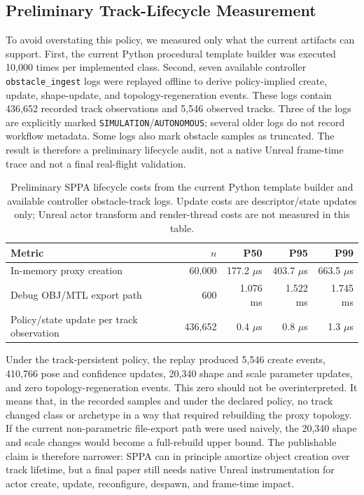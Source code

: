 ﻿\documentclass[11pt,a4paper]{article}
\begin{document}
\subsection{Preliminary Track-Lifecycle Measurement}

To avoid overstating this policy, we measured only what the current artifacts
can support. First, the current Python procedural template builder was executed
10,000 times per implemented class. Second, seven available controller
\texttt{obstacle\_ingest} logs were replayed offline to derive policy-implied
create, update, shape-update, and topology-regeneration events. These logs
contain 436,652 recorded track observations and 5,546 observed tracks. Three of
the logs are explicitly marked \texttt{SIMULATION}/\texttt{AUTONOMOUS}; several
older logs do not record workflow metadata. Some logs also mark obstacle
samples as truncated. The result is therefore a preliminary lifecycle audit,
not a native Unreal frame-time trace and not a final real-flight validation.

\begin{table}[h]
\centering
\small
\setlength{\tabcolsep}{4pt}
\caption{Preliminary SPPA lifecycle costs from the current Python template
builder and available controller obstacle-track logs. Update costs are
descriptor/state updates only; Unreal actor transform and render-thread costs
are not measured in this table.}
\label{tab:sppa-lifecycle}
\begin{tabular}{@{}p{4.7cm}r r r r@{}}
\toprule
Metric & \(n\) & P50 & P95 & P99 \\
\midrule
In-memory proxy creation & 60,000 & 177.2 \(\mu\)s & 403.7 \(\mu\)s & 663.5 \(\mu\)s \\
Debug OBJ/MTL export path & 600 & 1.076 ms & 1.522 ms & 1.745 ms \\
Policy/state update per track observation & 436,652 & 0.4 \(\mu\)s & 0.8 \(\mu\)s & 1.3 \(\mu\)s \\
\bottomrule
\end{tabular}
\end{table}

Under the track-persistent policy, the replay produced 5,546 create events,
410,766 pose and confidence updates, 20,340 shape and scale parameter updates,
and zero topology-regeneration events. This zero should not be overinterpreted.
It means that, in the recorded samples and under the declared policy, no track
changed class or archetype in a way that required rebuilding the proxy topology.
If the current non-parametric file-export path were used naively, the 20,340
shape and scale changes would become a full-rebuild upper bound.
The publishable claim is therefore narrower: SPPA can in principle amortize
object creation over track lifetime, but a final paper still needs native
Unreal instrumentation for actor create, update, reconfigure, despawn, and
frame-time impact.
\end{document}
